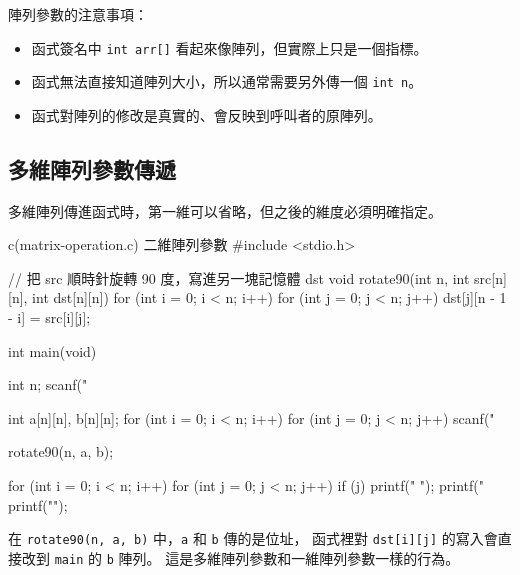 
陣列參數的注意事項：
\begin{itemize}
\item 函式簽名中 \texttt{int arr[]} 看起來像陣列，但實際上只是一個指標。
\item 函式無法直接知道陣列大小，所以通常需要另外傳一個 \texttt{int n}。
\item 函式對陣列的修改是真實的、會反映到呼叫者的原陣列。
\end{itemize}

\subsection{多維陣列參數傳遞}

多維陣列傳進函式時，第一維可以省略，但之後的維度必須明確指定。

\begin{example}{c}{(matrix-operation.c) 二維陣列參數}
#include <stdio.h>

// 把 src 順時針旋轉 90 度，寫進另一塊記憶體 dst
void rotate90(int n, int src[n][n], int dst[n][n]) {
    for (int i = 0; i < n; i++) {
        for (int j = 0; j < n; j++) {
            dst[j][n - 1 - i] = src[i][j];
        }
    }
}

int main(void) {
    int n;
    scanf("%

    int a[n][n], b[n][n];
    for (int i = 0; i < n; i++) {
        for (int j = 0; j < n; j++) {
            scanf("%
        }
    }

    rotate90(n, a, b);

    for (int i = 0; i < n; i++) {
        for (int j = 0; j < n; j++) {
            if (j) printf(" ");
            printf("%
        }
        printf("\n");
    }
}
\end{example}


在 \texttt{rotate90(n, a, b)} 中，\texttt{a} 和 \texttt{b} 傳的是位址，
函式裡對 \texttt{dst[i][j]} 的寫入會直接改到 \texttt{main} 的 \texttt{b}
陣列。 這是多維陣列參數和一維陣列參數一樣的行為。


